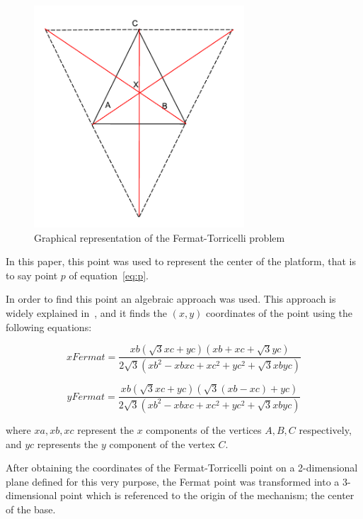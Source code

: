 \documentclass[titlepage, letterpaper]{article}
\begin{document}
\begin{figure}[htbp]
    \centering
    \includegraphics[width=0.7\textwidth]{fig_fermat}
    \caption{Graphical representation of the Fermat-Torricelli problem}
    \label{fig:fermat_problem}
\end{figure}


In this paper, this point was used to represent the center of the platform, that is to say point $p$ of equation~\ref{eq:p}.

In order to find this point an algebraic approach was used.
This approach is widely explained in~\cite{Palacios-Velez2015}, and it finds the $(x,y)$ coordinates of the point using the following equations:

\begin{equation}
    \label{eq:fermat_x}
    xFermat = \frac{xb(\sqrt{3}xc + yc)(xb + xc + \sqrt{3} yc)}{2\sqrt{3}(xb^2 - xb xc + xc^2 + yc^2 + \sqrt{3} xb yc)}
\end{equation}

\begin{equation}
    \label{eq:fermat_y}
    yFermat = \frac{xb(\sqrt{3}xc + yc)(\sqrt{3}(xb - xc) + yc)}{2\sqrt{3}(xb^2 - xb xc + xc^2 + yc^2 + \sqrt{3} xb yc)}
\end{equation}

where $xa, xb, xc$ represent the $x$ components of the vertices $A,B,C$ respectively, and $yc$ represents the $y$ component of the vertex $C$.

After obtaining the coordinates of the Fermat-Torricelli point on a 2-dimensional plane defined for this very purpose, the Fermat point was transformed into a 3-dimensional point which is referenced to the origin of the mechanism; the center of the base.
\end{document}
